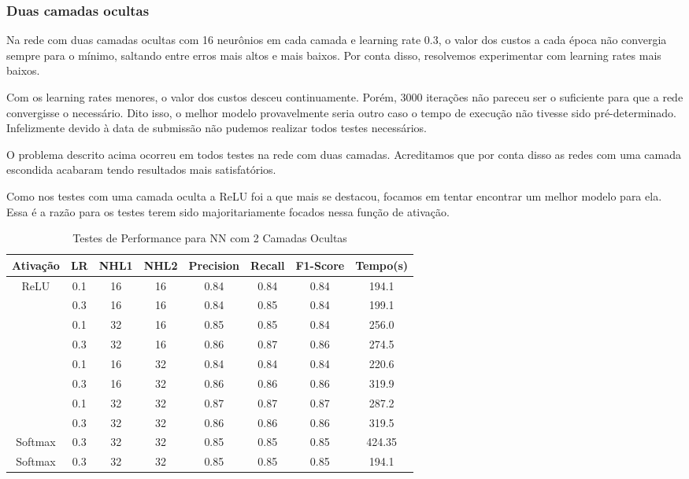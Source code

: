 \documentclass[conference]{IEEEtran}
\begin{document}
\subsubsection{Duas camadas ocultas}

	Na rede com duas camadas ocultas com 16 neurônios em cada camada e learning rate 0.3, o valor dos custos a cada época não convergia sempre para o mínimo, saltando entre erros mais altos e mais baixos. Por conta disso, resolvemos experimentar com learning rates mais baixos.
	
	Com os learning rates menores, o valor dos custos desceu continuamente. Porém, 3000 iterações não pareceu ser o suficiente para que a rede convergisse o necessário. Dito isso, o melhor modelo provavelmente seria outro caso o tempo de execução não tivesse sido pré-determinado. Infelizmente devido à data de submissão não pudemos realizar todos testes necessários.
	
	O problema descrito acima ocorreu em todos testes na rede com duas camadas. Acreditamos que por conta disso as redes com uma camada escondida acabaram tendo resultados mais satisfatórios.
	
	Como nos testes com uma camada oculta a ReLU foi a que mais se destacou, focamos em tentar encontrar um melhor modelo para ela. Essa é a razão para os testes terem sido majoritariamente focados nessa função de ativação.

\begin{table}[h!]
 \begin{center}
  \caption{Testes de Performance para NN com 2 Camadas Ocultas}
  \label{table:table2}
  \begin{tabular}{ |c|c|c|c|c|c|c|c| }
   \hline
   Ativação & LR & NHL1 & NHL2 & Precision & Recall & F1-Score & Tempo(s)\\
   \hline
   ReLU & 0.1 & 16 & 16 & 0.84 & 0.84 & 0.84 & 194.1 \\
        & 0.3 & 16 & 16 & 0.84 & 0.85 & 0.84 & 199.1 \\
        & 0.1 & 32 & 16 & 0.85 & 0.85 & 0.84 & 256.0 \\
        & 0.3 & 32 & 16 & 0.86 & 0.87 & 0.86 & 274.5 \\
        & 0.1 & 16 & 32 & 0.84 & 0.84 & 0.84 & 220.6 \\
        & 0.3 & 16 & 32 & 0.86 & 0.86 & 0.86 & 319.9 \\
        & 0.1 & 32 & 32 & 0.87 & 0.87 & 0.87 & 287.2 \\
        & 0.3 & 32 & 32 & 0.86 & 0.86 & 0.86 & 319.5 \\
   \hline
   Softmax & 0.3 & 32 & 32 & 0.85 & 0.85 & 0.85 & 424.35 \\
   Softmax & 0.3 & 32 & 32 & 0.85 & 0.85 & 0.85 & 194.1 \\

 \hline
 \end{tabular}
 \end{center}
\end{table}
\end{document}
